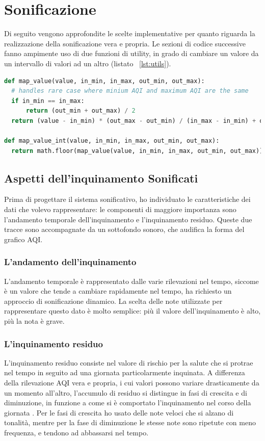 \section{Sonificazione}
Di seguito vengono approfondite le scelte implementative per quanto riguarda la realizzazione della sonificazione vera e propria.
Le sezioni di codice successive fanno ampimente uso di due funzioni di utility, in grado di cambiare un valore da un intervallo di valori ad un altro (listato ~\ref{lst:utils}).

\begin{lstlisting}[language=Python,caption={Funzioni utility.},label={lst:utils}]
def map_value(value, in_min, in_max, out_min, out_max):
  # handles rare case where minium AQI and maximum AQI are the same
  if in_min == in_max:
      return (out_min + out_max) / 2
  return (value - in_min) * (out_max - out_min) / (in_max - in_min) + out_min

def map_value_int(value, in_min, in_max, out_min, out_max):
  return math.floor(map_value(value, in_min, in_max, out_min, out_max))
\end{lstlisting}



\subsection{Aspetti dell'inquinamento Sonificati}
Prima di progettare il sistema sonificativo, ho individuato le caratteristiche dei dati che volevo rappresentare:
le componenti di maggiore importanza sono l’andamento temporale dell'inquinamento e l'inquinamento residuo.
Queste due tracce sono accompagnate da un sottofondo sonoro, che audifica la forma del grafico AQI.
\subsubsection{L'andamento dell'inquinamento}
L'andamento temporale è rappresentato dalle varie rilevazioni nel tempo, siccome è un valore che tende a cambiare rapidamente nel tempo, ha richiesto un approccio di sonificazione dinamico.
La scelta delle note utilizzate per rappresentare questo dato è molto semplice: più il valore dell'inquinamento è alto, più la nota è grave.
\subsubsection{L'inquinamento residuo}
L'inquinamento residuo consiste nel valore di rischio per la salute che si protrae nel tempo in seguito ad una giornata particolarmente inquinata.
A differenza della rilevazione AQI vera e propria, i cui valori possono variare drasticamente da un momento all'altro, l'accumulo di residuo si distingue in fasi di crescita e di diminuzione, in funzione a come si è comportato l'inquinamento nel corso della giornata \cite{residue}.
Per le fasi di crescita ho usato delle note veloci che si alzano di tonalità, mentre per la fase di diminuzione le stesse note sono ripetute con meno frequenza, e tendono ad abbassarsi nel tempo.
